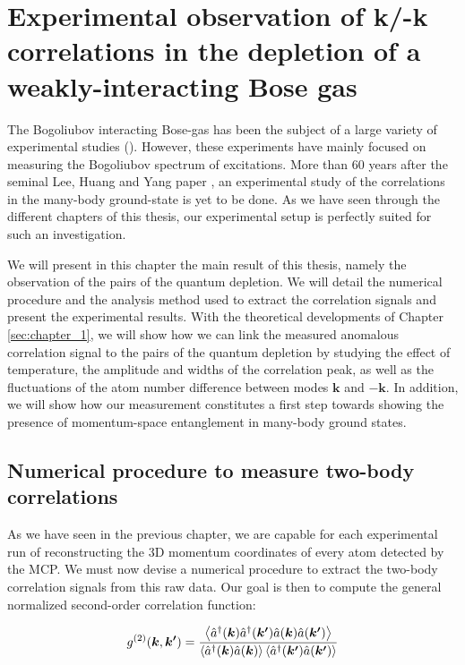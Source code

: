 \chapter{Experimental observation of k/-k correlations in the depletion of a weakly-interacting Bose gas}

\label{sec:chapter_4}

The Bogoliubov interacting Bose-gas has been the subject of a large variety of experimental studies (\cite{fontaine2018,miller1962,ozeri2005,stepanov2019}). However, these experiments have mainly focused on measuring the Bogoliubov spectrum of excitations. More than 60 years after the seminal Lee, Huang and Yang paper \cite{lee1957}, an experimental study of the correlations in the many-body ground-state is yet to be done. As we have seen through the different chapters of this thesis, our experimental setup is perfectly suited for such an investigation. 

We will present in this chapter the main result of this thesis, namely the observation of the \kmk pairs of the quantum depletion. We will detail the numerical procedure and the analysis method used to extract the correlation signals and present the experimental results. With the theoretical developments of Chapter \ref{sec:chapter_1}, we will show how we can link the measured anomalous correlation signal to the \kmk pairs of the quantum depletion by studying the effect of temperature, the amplitude and widths of the correlation peak, as well as the fluctuations of the atom number difference between modes $\bm{k}$ and $-\bm{k}$. In addition, we will show how our measurement constitutes a first step towards showing the presence of momentum-space entanglement in many-body ground states.

\section{Numerical procedure to measure two-body correlations}

\label{sec:numerical_calculation}

As we have seen in the previous chapter, we are capable for each experimental run of reconstructing the 3D momentum coordinates of every atom detected by the MCP. We must now devise a numerical procedure to extract the two-body correlation signals from this raw data. Our goal is then to compute the general normalized second-order correlation function:

\begin{equation}
    g^{(2)} (\bm{k},\bm{k'}) = \frac{\left\langle\hat{a}^{\dagger}(\bm{k}) \hat{a}^{\dagger}(\bm{k'}) \hat{a}(\bm{k}) \hat{a}(\bm{k'})\right\rangle}{\left\langle\hat{a}^{\dagger}(\bm{k}) \hat{a}(\bm{k}) \right\rangle \left\langle\hat{a}^{\dagger}(\bm{k'}) \hat{a}(\bm{k'}) \right\rangle}
\end{equation}

